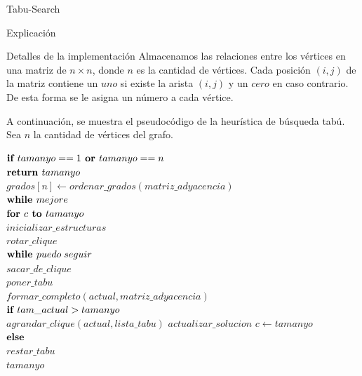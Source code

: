 \begin{section}{Tabu-Search}
\begin{subsection}{Explicación}

	\end{subsection}
	\begin{subsection}{Detalles de la implementación}
		Almacenamos las relaciones entre los vértices en una matriz de $n \times n$, donde $n$ es la cantidad de vértices. Cada posición $(i,j)$ de la matriz contiene un $uno$ si existe la arista $(i,j)$ y un $cero$ en caso contrario. De esta forma se le asigna un número a cada vértice.

		A continuación, se muestra el pseudocódigo de la heurística de búsqueda tabú.\\

		Sea $n$ la cantidad de vértices del grafo.

		\begin{pseudo}
			\tab $\textbf{if } tamanyo==1 \textbf{ or } tamanyo==n$\\
			\tab \tab $\textbf{return } tamanyo$\\
			\tab $grados[n] \leftarrow ordenar\_grados(matriz\_adyacencia)$\\
			\tab $\textbf{while } mejore$\\
			\tab \tab $\textbf{for } c \textbf{ to } tamanyo$\\
			\tab \tab \tab $inicializar\_estructuras$\\
			\tab \tab \tab $rotar\_clique$\\
			\tab \tab \tab $\textbf{while } puedo\;seguir$\\
			\tab \tab \tab \tab $sacar\_de\_clique$\\
			\tab \tab \tab \tab $poner\_tabu$\\
			\tab \tab \tab \tab $formar\_completo(actual,matriz\_adyacencia)$\\
			\tab \tab \tab \tab $\textbf{if } tam\_actual>tamanyo$\\
			\tab \tab \tab \tab \tab $agrandar\_clique(actual,lista\_tabu)$
			\tab \tab \tab \tab \tab $actualizar\_solucion$
			\tab \tab \tab \tab \tab $c \leftarrow tamanyo$\\
			\tab \tab \tab \tab $\textbf{else }$\\
			\tab \tab \tab \tab \tab $restar\_tabu$\\
			\tab \RET $tamanyo$\\
		\end{pseudo}


\end{subsection}
\end{section}
